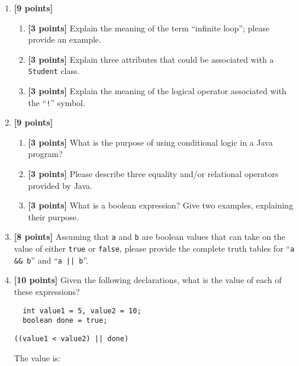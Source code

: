 \begin{enumerate}
\item {\bf [9 points]}
\begin{enumerate}
\item {\bf [3 points]} 
Explain the meaning of the term ``infinite loop''; please provide an example.
\bigskip
\bigskip
\bigskip
\item {\bf [3 points]} 
Explain three attributes that could be associated with a {\tt Student} class.
\bigskip
\bigskip
\bigskip
\bigskip
\item {\bf [3 points]} 
  Explain the meaning of the logical operator associated with the ``{\tt !}'' symbol.
\bigskip
\bigskip
\bigskip
\bigskip
\end{enumerate}
\item {\bf [9 points]}
\begin{enumerate}
\item {\bf [3 points]} 
What is the purpose of using conditional logic in a Java program?
\bigskip
\bigskip
\bigskip
\bigskip
\item {\bf [3 points]} 
Please describe three equality and/or relational operators provided by Java.
\bigskip
\bigskip
\bigskip
\bigskip
\item {\bf [3 points]} 
What is a boolean expression? Give two examples, explaining their purpose.
\end{enumerate}
\bigskip
\bigskip
\bigskip
\bigskip

\item {\bf [8 points]}
  Assuming that {\tt a} and {\tt b} are boolean values that can take on the value of either {\tt true} or {\tt false},
  please provide the complete truth tables for ``{\tt a \&\& b}'' and ``{\tt a || b}''.

\vspace{1.2in}

\item {\bf[10 points]} Given the following declarations, what is the value of each of these expressions?

  \begin{verbatim}
  int value1 = 5, value2 = 10;
  boolean done = true;
  \end{verbatim}

  \vspace*{-.35in}
  
\begin{verbatim}
((value1 < value2) || done)
\end{verbatim}

\vspace*{-.175in}
The value is: \mbox{\underline{\hspace{3in}}}


\end{enumerate}
